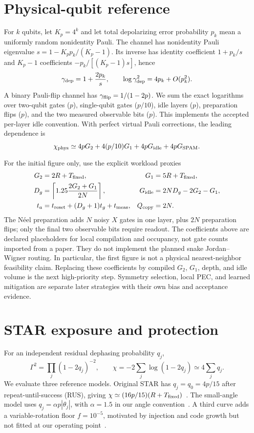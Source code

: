 \documentclass[11pt]{article}
\begin{document}
\section{Physical-qubit reference}
For $k$ qubits, let $K_p=4^k$ and let total depolarizing error probability $p_k$
mean a uniformly random nonidentity Pauli. The channel has nonidentity Pauli
eigenvalue $s=1-K_pp_k/(K_p-1)$. Its inverse has identity coefficient
$1+p_k/s$ and $K_p-1$ coefficients $-p_k/[(K_p-1)s]$, hence
\begin{equation}
 \gamma_{\rm dep}=1+\frac{2p_k}{s},\qquad
 \log\gamma_{\rm dep}^2=4p_k+O(p_k^2).
\end{equation}
A binary Pauli-flip channel has $\gamma_{\rm flip}=1/(1-2p)$.
We sum the exact logarithms over two-qubit gates ($p$), single-qubit gates
($p/10$), idle layers ($p$), preparation flips ($p$), and the two measured
observable bits ($p$). This implements the accepted per-layer idle convention.
With perfect virtual Pauli corrections, the leading dependence is
\begin{equation}
 \chi_{\rm phys}\simeq4pG_2+4(p/10)G_1+4pG_{\rm idle}+4pG_{\rm SPAM}.
\end{equation}

For the initial figure only, use the explicit workload proxies
\begin{align}
 G_2&=2R+T_{\rm fixed},&G_1&=5R+T_{\rm fixed},\\
 D_g&=\left\lceil1.25\frac{2G_2+G_1}{2N}\right\rceil,&
 G_{\rm idle}&=2ND_g-2G_2-G_1,\\
 t_a&=t_{\rm reset}+(D_g+1)t_g+t_{\rm meas},&Q_{\rm copy}&=2N.
\end{align}
The N\'eel preparation adds $N$ noisy $X$ gates in one layer, plus $2N$
preparation flips; only the final two observable bits require readout.
The coefficients above are declared placeholders for local compilation and
occupancy, not gate counts imported from a paper. They do not implement the
planned snake Jordan--Wigner routing. In particular, the first figure is not
a physical nearest-neighbor feasibility claim. Replacing these coefficients
by compiled $G_2$, $G_1$, depth, and idle volume is the next high-priority step.
Symmetry selection, local PEC, and learned mitigation are separate later
strategies with their own bias and acceptance evidence.

\section{STAR exposure and protection}
For an independent residual dephasing probability $q_j$,
\begin{equation}\label{eq:star}
 \Gamma^2=\prod_j(1-2q_j)^{-2},\qquad
 \chi=-2\sum_j\log(1-2q_j)\simeq4\sum_jq_j.
\end{equation}
We evaluate three reference models. Original STAR has
$q_j=q_0=4p/15$ after repeat-until-success (RUS), giving
$\chi\simeq(16p/15)(R+T_{\rm fixed})$~\cite{akahoshi}.
The small-angle model uses $q_j=\alpha p|\theta_j|$, with
$\alpha=1.5$ in our angle convention~\cite{toshio}. A third curve adds a
variable-rotation floor $f=10^{-5}$, motivated by injection and code growth
but not fitted at our operating point~\cite{chung}.
\end{document}
